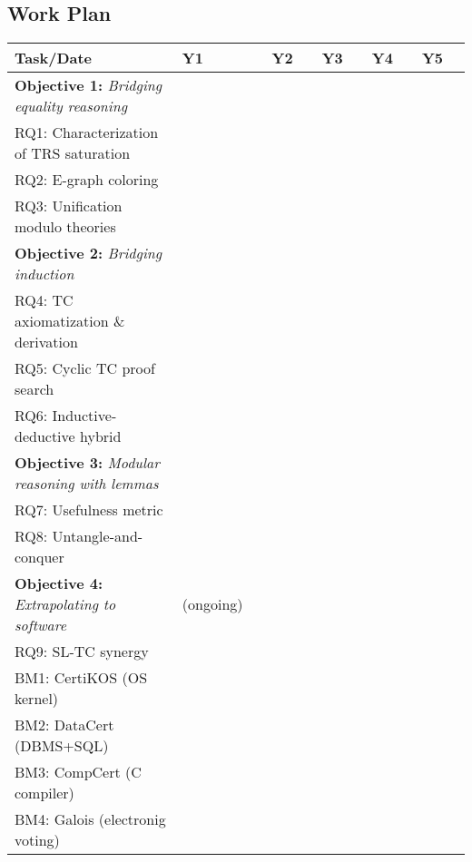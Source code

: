 \subsection*{Work Plan}

\newcommand\yrsz{5mm}
\newcommand\doh{\cellcolor{blue!25!white}}
\newcommand\dog{\cellcolor{gray!25!white}}

\begin{tabular}
{|l|p{\yrsz}p{\yrsz}|p{\yrsz}p{\yrsz}|p{\yrsz}p{\yrsz}|p{\yrsz}p{\yrsz}|p{\yrsz}p{\yrsz}|}
\hline
Task/Date & Y1 & & Y2 & & Y3 & & Y4 & & Y5 & \\ \hline
\textbf{Objective 1:} \textit{Bridging equality reasoning} & & & & & & & & & & \\
RQ1: Characterization of TRS saturation & \doh & \doh & \doh & & & & & & & \\
RQ2: E-graph coloring & & & \doh & \doh &&&&&& \\
RQ3: Unification modulo theories & & & & \doh & \doh & \doh &&&& \\ \hline
\textbf{Objective 2:} \textit{Bridging induction} &&&&&&&&&& \\
RQ4: TC axiomatization \& derivation & \doh & \doh &&&&&&&& \\
RQ5: Cyclic TC proof search & & \doh & \doh & \doh &&&&&& \\
RQ6: Inductive-deductive hybrid & & & & \doh & \doh & \doh &&&& \\ \hline
\textbf{Objective 3:} \textit{Modular reasoning with lemmas} & & & & & & & & & & \\
RQ7: Usefulness metric & & & & & & \doh & \doh & & & \\
RQ8: Untangle-and-conquer  & & & & & & & \doh & \doh & \doh & \\ \hline
\textbf{Objective 4:} \textit{Extrapolating to software}  & {\small (ongoing)} & & \dog & \dog & \dog & \dog & \dog & \dog & \dog & \dog \\
RQ9: SL-TC synergy & & & \doh & \doh &&&&&& \\
BM1: CertiKOS (OS kernel) & & & & & \doh & \doh &&&& \\
BM2: DataCert (DBMS+SQL) & & & & & & \doh & \doh &&& \\
BM3: CompCert (C compiler) & & & & & & & \doh & \doh & \doh &  \\
BM4: Galois (electronig voting) & & & & & & &  & & \doh & \doh  \\
\hline
\end{tabular}

